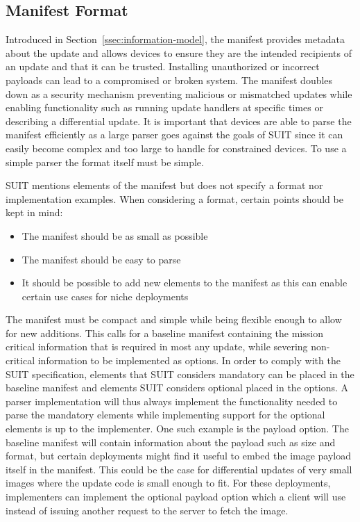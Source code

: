 \documentclass[0-thesis.tex]{subfiles}
\begin{document}
\subsection{Manifest Format}
\label{ssec:manifest-format}
Introduced in Section~\ref{ssec:information-model}, the manifest provides metadata about
the update and allows devices to ensure they are the intended recipients of an update and
that it can be trusted. Installing unauthorized or incorrect payloads can lead to a
compromised or broken system. The manifest doubles down as a security mechanism preventing
malicious or mismatched updates while enabling functionality such as running update
handlers at specific times or describing a differential update. It is important that
devices are able to parse the manifest efficiently as a large parser goes against the
goals of SUIT since it can easily become complex and too large to handle for constrained
devices. To use a simple parser the format itself must be simple.

SUIT mentions elements of the manifest but does not specify a format nor implementation
examples. When considering a format, certain points should be kept in mind:

\begin{itemize}
        \item The manifest should be as small as possible
        \item The manifest should be easy to parse
        \item It should be possible to add new elements to the manifest as this can enable
                certain use cases for niche deployments
\end{itemize}

The manifest must be compact and simple while being flexible enough to allow for new
additions. This calls for a baseline manifest containing the mission critical information
that is required in most any update, while severing non-critical information to be
implemented as options. In order to comply with the SUIT specification, elements that SUIT
considers mandatory can be placed in the baseline manifest and elements SUIT considers
optional placed in the options. A parser implementation will thus always implement the
functionality needed to parse the mandatory elements while implementing support for the
optional elements is up to the implementer. One such example is the payload option. The
baseline manifest will contain information about the payload such as size and format, but
certain deployments might find it useful to embed the image payload itself in the
manifest. This could be the case for differential updates of very small images where the
update code is small enough to fit. For these deployments, implementers can implement the
optional payload option which a client will use instead of issuing another request to the
server to fetch the image.
\end{document}
